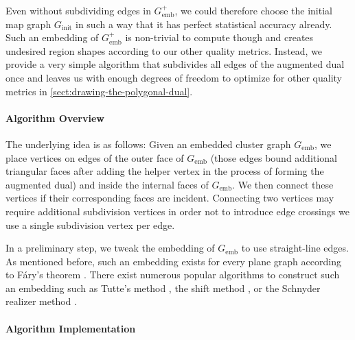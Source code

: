 Even without subdividing edges in $G_\text{emb}^+$, we could therefore choose the initial map graph $G_\text{init}$ in such a way that it has perfect statistical accuracy already. Such an embedding of $G_\text{emb}^+$ is non-trivial to compute though and creates undesired region shapes according to our other quality metrics. Instead, we provide a very simple algorithm that subdivides all edges of the augmented dual once and leaves us with enough degrees of freedom to optimize for other quality metrics in \cref{sect:drawing-the-polygonal-dual}.


\paragraph{Algorithm Overview}

The underlying idea is as follows: Given an embedded cluster graph $G_\text{emb}$, we place vertices on edges of the outer face of $G_\text{emb}$ (those edges bound additional triangular faces after adding the helper vertex in the process of forming the augmented dual) and inside the internal faces of $G_\text{emb}$. We then connect these vertices if their corresponding faces are incident. Connecting two vertices may require additional subdivision vertices in order not to introduce edge crossings \emdash{} we use a single subdivision vertex per edge.

In a preliminary step, we tweak the embedding of $G_\text{emb}$ to use straight-line edges. As mentioned before, such an embedding exists for every plane graph according to Fáry's theorem \cite{fary1948straight}. There exist numerous popular algorithms to construct such an embedding such as Tutte's method \cite{tutte1963draw}, the shift method \cite{fraysseix1990draw}, or the Schnyder realizer method \cite{schnyder1990embedding}. 


\clearpage
\paragraph{Algorithm Implementation}

